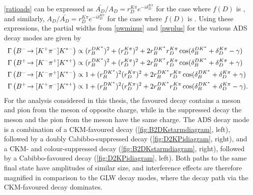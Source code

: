 \Eqn\ref{ratioads} can be expressed as $\bar{A_{D}}/A_{D} = r_D^{K\pi}e^{-i\delta_D^{K\pi}}$ for the case where $f(D)$ is \Km\pip, and similarly, $A_{D}/\bar{A_{D}} = r_D^{K\pi}e^{-i\delta_D^{K\pi}}$ for the case where $f(D)$ is \Kp\pim. Using these expressions, the partial widths from \eqns\ref{pwminus} and \ref{pwplus} for the various \decay{\Bpm}{\D\Kstarpm} ADS decay modes are given by
\begin{align}
\Gamma\left({{{B}^-}}\!\rightarrow [{{K}^+}{{\pi}^-}]{\ensuremath{{K}^{*-}}}\right) &\propto (r_B^{DK^*})^2 + (r_D^{K\pi})^2 + 2r_B^{DK^*}r_D^{K\pi}\cos(\delta_B^{DK^*} + \delta_D^{K\pi} - \gamma) \label{adsBdecaym} \\
\Gamma\left({{{B}^+}}\!\rightarrow [{{K}^-}{{\pi}^+}]{\ensuremath{{K}^{*+}}}\right) &\propto (r_B^{DK^*})^2 + (r_D^{K\pi})^2 + 2r_B^{DK^*}r_D^{K\pi}\cos(\delta_B^{DK^*} + \delta_D^{K\pi} + \gamma) \label{adsBdecayp} \\
\Gamma\left({{{B}^-}}\!\rightarrow [{{K}^-}{{\pi}^+}]{\ensuremath{{K}^{*-}}}\right) &\propto 1 + (r_B^{DK^*})^2(r_D^{K\pi})^2 + 2r_B^{DK^*}r_D^{K\pi}\cos(\delta_B^{DK^*} + \delta_D^{K\pi} + \gamma) \label{favBdecaym} \\
\Gamma\left({{{B}^+}}\!\rightarrow [{{K}^+}{{\pi}^-}]{\ensuremath{{K}^{*+}}}\right) &\propto 1 + (r_B^{DK^*})^2(r_D^{K\pi})^2 + 2r_B^{DK^*}r_D^{K\pi}\cos(\delta_B^{DK^*} + \delta_D^{K\pi} - \gamma) \text {.} \label{favBdecayp} 
\end{align}
For the analysis considered in this thesis, the favoured decay contains a \Kstarm meson and pion from the \D meson of opposite charge, while in the suppressed decay the \Kstarm meson and the pion from the \D meson have the same charge. The ADS decay mode is a combination of a CKM-favoured \decay{\Bm}{\Dz\Kstarm} decay (\fig\ref{fig:B2DKstarmdiagram}, left), followed by a doubly Cabibbo-suppressed \decay{\Dz}{\Kp\pim} decay (\fig\ref{fig:D2KPidiagram}, right), and a CKM- and colour-suppressed \decay{\Bm}{\Dzb\Kstarm} decay (\fig\ref{fig:B2DKstarmdiagram}, right), followed by a Cabibbo-favoured \decay{\Dzb}{\Kp\pim} decay (\fig\ref{fig:D2KPidiagram}, left). Both paths to the same final state have amplitudes of similar size, and interference effects are therefore magnified in comparison to the GLW decay modes, where the decay path via the CKM-favoured \decay{\Bm}{\Dz\Kstarm} decay dominates.

